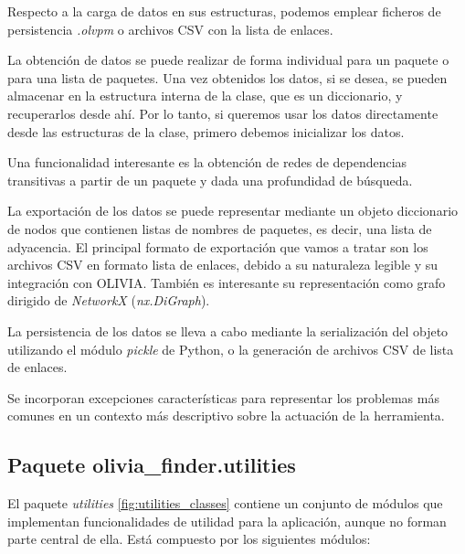 Respecto a la carga de datos en sus estructuras, podemos emplear ficheros de
persistencia \textit{.olvpm} o archivos CSV con la lista de enlaces.

La obtención de datos se puede realizar de forma individual para un paquete o para una lista de
paquetes. Una vez obtenidos los datos, si se desea, se pueden almacenar en la estructura interna
de la clase, que es un diccionario, y recuperarlos desde ahí. Por lo tanto, si queremos usar los
datos directamente desde las estructuras de la clase, primero debemos inicializar los datos.

Una funcionalidad interesante es la obtención de redes de dependencias transitivas a partir de un
paquete y dada una profundidad de búsqueda.

La exportación de los datos se puede representar mediante un objeto diccionario de nodos que
contienen listas de nombres de paquetes, es decir, una lista de adyacencia. El principal formato
de exportación que vamos a tratar son los archivos CSV en formato lista de enlaces, debido a su
naturaleza legible y su integración con OLIVIA. También es interesante su representación como
grafo dirigido de \textit{NetworkX} (\textit{nx.DiGraph}).

La persistencia de los datos se lleva a cabo mediante la serialización del objeto utilizando el
módulo \textit{pickle} de Python, o la generación de archivos CSV de lista de enlaces.

Se incorporan excepciones características para representar los problemas más comunes en un contexto
más descriptivo sobre la actuación de la herramienta.


\subsection{Paquete olivia\_finder.utilities}

El paquete \textit{utilities} \ref{fig:utilities_classes} contiene un conjunto de módulos que implementan funcionalidades de
utilidad para la aplicación, aunque no forman parte central de ella. Está compuesto por los siguientes módulos:

